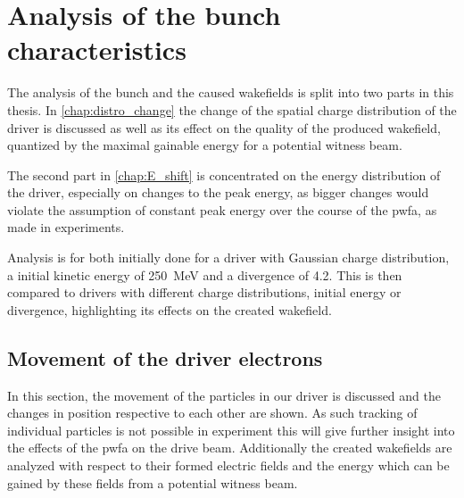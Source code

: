 \documentclass[bachelor_thesis]{subfiles}
\begin{document}
\chapter{Analysis of the bunch characteristics}
The analysis of the bunch and the caused wakefields is split into two parts in this thesis. In \autoref{chap:distro_change} the change of the spatial charge distribution of the driver is discussed as well as its effect on the quality of the produced wakefield, 
quantized by the maximal gainable energy for a potential witness beam.

The second part in \autoref{chap:E_shift} is concentrated on the energy distribution of the driver, especially on changes to the peak energy, as bigger changes would violate the assumption of constant peak energy over the course of the \gls{pwfa}, as made in experiments.

Analysis is for both initially done for a driver with Gaussian charge distribution, a initial kinetic energy of \qty{250}{\MeV} and a divergence of \qty{4.2}{\mrad}. This is then compared to drivers with different charge distributions, initial energy or divergence,
highlighting its effects on the created wakefield. 
 
\section{Movement of the driver electrons} \label{chap:distro_change}
In this section, the movement of the particles in our driver is discussed and the changes in position respective to each other are shown. As such tracking of individual particles is not possible in experiment
this will give further insight into the effects of the \gls{pwfa} on the drive beam. Additionally the created wakefields are analyzed with respect to their formed electric fields and the energy which can be
gained by these fields from a potential witness beam. 
\end{document}
